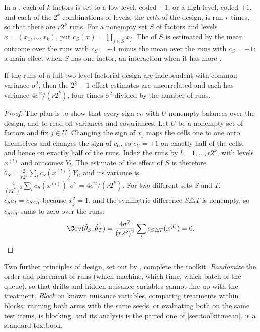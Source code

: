 \begin{refsection}
In a , each of $k$ factors is set to a low level, coded $-1$, or a high level, coded $+1$, and each of the $2^k$ combinations of levels, the \emph{cells} of the design, is run $r$ times, so that there are $r2^k$ runs. For a nonempty set $S$ of factors and levels $x=(x_1,\dots,x_k)$, put $c_S(x)=\prod_{j\in S}x_j$. The  of $S$ is estimated by the mean outcome over the runs with $c_S=+1$ minus the mean over the runs with $c_S=-1$: a main effect when $S$ has one factor, an interaction when it has more \parencite{BoxHunterHunter2005}.

\begin{proposition}\label{thm:toolkit:factorial}
If the runs of a full two-level factorial design are independent with common variance $\sigma^2$, then the $2^k-1$ effect estimates are uncorrelated and each has variance $4\sigma^2/(r2^k)$, four times $\sigma^2$ divided by the number of runs.
\end{proposition}

\begin{proof}
The plan is to show that every sign $c_U$ with $U$ nonempty balances over the design, and to read off variances and covariances. Let $U$ be a nonempty set of factors and fix $j\in U$. Changing the sign of $x_j$ maps the cells one to one onto themselves and changes the sign of $c_U$, so $c_U=+1$ on exactly half of the cells, and hence on exactly half of the runs. Index the runs by $l=1,\dots,r2^k$, with levels $x^{(l)}$ and outcomes $Y_l$. The estimate of the effect of $S$ is therefore $\hat\theta_S=\frac2{r2^k}\sum_lc_S(x^{(l)})Y_l$, and its variance is $\frac4{(r2^k)^2}\sum_lc_S(x^{(l)})^2\sigma^2=4\sigma^2/(r2^k)$. For two different sets $S$ and $T$, $c_S c_T=c_{S\triangle T}$ because $x_j^2=1$, and the symmetric difference $S\triangle T$ is nonempty, so $c_{S\triangle T}$ sums to zero over the runs:
\[
\Cov(\hat\theta_S,\hat\theta_T)=\frac{4\sigma^2}{(r2^k)^2}\sum_lc_{S\triangle T}(x^{(l)})=0.\qedhere
\]
\end{proof}

Two further principles of design, set out by \textcite{Fisher1935}, complete the toolkit. \emph{Randomize} the order and placement of runs (which machine, which time, which batch of the queue), so that drifts and hidden nuisance variables cannot line up with the treatment. \emph{Block} on known nuisance variables, comparing treatments within blocks: running both arms with the same seeds, or evaluating both on the same test items, is blocking, and its analysis is the paired one of \cref{sec:toolkit:mean}. \Textcite{Montgomery2017} is a standard textbook.


\end{refsection}
